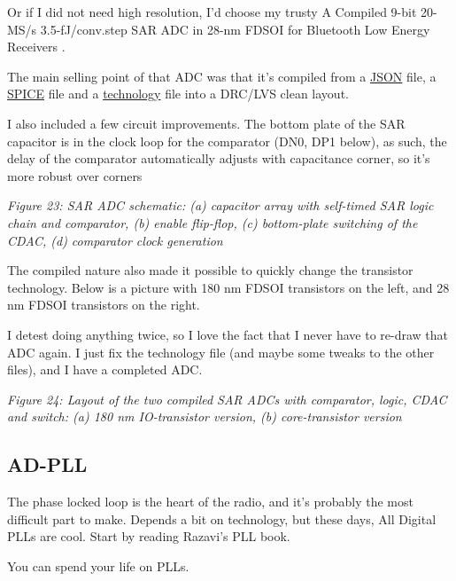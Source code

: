 Or if I did not need high resolution, I'd choose my trusty A Compiled
9-bit 20-MS/s 3.5-fJ/conv.step SAR ADC in 28-nm FDSOI for Bluetooth Low
Energy Receivers .

The main selling point of that ADC was that it's compiled from a
\href{https://github.com/wulffern/sun_sar9b_sky130nm/blob/main/cic/ip.json}{JSON}
file, a
\href{https://github.com/wulffern/sun_sar9b_sky130nm/blob/main/cic/ip.spi}{SPICE}
file and a
\href{https://github.com/wulffern/sun_sar9b_sky130nm/blob/main/cic/sky130.tech}{technology}
file into a DRC/LVS clean layout.

I also included a few circuit improvements. The bottom plate of the SAR
capacitor is in the clock loop for the comparator (DN0, DP1 below), as
such, the delay of the comparator automatically adjusts with capacitance
corner, so it's more robust over corners


{
\centering
{}
}

\emph{Figure 23: SAR ADC schematic: (a) capacitor array with self-timed
SAR logic chain and comparator, (b) enable flip-flop, (c) bottom-plate
switching of the CDAC, (d) comparator clock generation}

The compiled nature also made it possible to quickly change the
transistor technology. Below is a picture with 180 nm FDSOI transistors
on the left, and 28 nm FDSOI transistors on the right.

I detest doing anything twice, so I love the fact that I never have to
re-draw that ADC again. I just fix the technology file (and maybe some
tweaks to the other files), and I have a completed ADC.


{
\centering
{}
}

\emph{Figure 24: Layout of the two compiled SAR ADCs with comparator,
logic, CDAC and switch: (a) 180 nm IO-transistor version, (b)
core-transistor version}

\subsection{AD-PLL}\label{ad-pll}

The phase locked loop is the heart of the radio, and it's probably the
most difficult part to make. Depends a bit on technology, but these
days, All Digital PLLs are cool. Start by reading Razavi's PLL book.

You can spend your life on PLLs.


